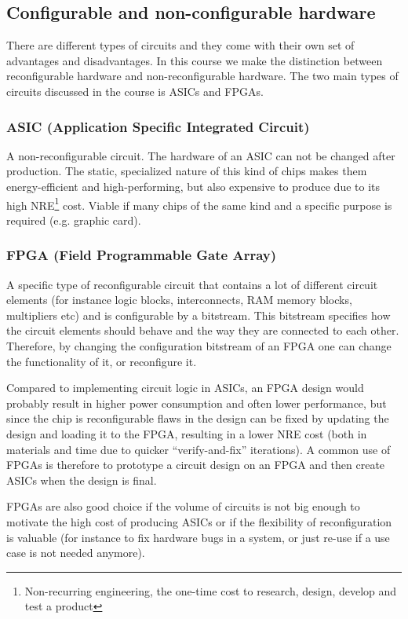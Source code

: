 \documentclass{article}
\begin{document}
\subsection{Configurable and non-configurable hardware}
There are different types of circuits and they come with their own set
of advantages and disadvantages. In this course we make the
distinction between reconfigurable hardware and non-reconfigurable
hardware. The two main types of circuits discussed in the course is
ASICs and FPGAs.

\subsubsection{ASIC (Application Specific Integrated Circuit)}
A non-reconfigurable circuit. The hardware of an ASIC can not be
changed after production. The static, specialized nature of this kind
of chips makes them energy-efficient and high-performing, but also
expensive to produce due to its high NRE\footnote{Non-recurring
  engineering, the one-time cost to research, design, develop and test
  a product} cost. Viable if many chips of the same kind and a
specific purpose is required (e.g. graphic card).

\subsubsection{FPGA (Field Programmable Gate Array)}
A specific type of reconfigurable circuit that contains a lot of
different circuit elements (for instance logic blocks, interconnects,
RAM memory blocks, multipliers etc) and is configurable by a
bitstream. This bitstream specifies how the circuit elements should
behave and the way they are connected to each other. Therefore, by
changing the configuration bitstream of an FPGA one can change the
functionality of it, or reconfigure it.

Compared to implementing circuit logic in ASICs, an FPGA design would
probably result in higher power consumption and often lower
performance, but since the chip is reconfigurable flaws in the design
can be fixed by updating the design and loading it to the FPGA,
resulting in a lower NRE cost (both in materials and time due to
quicker ``verify-and-fix'' iterations). A common use of FPGAs is
therefore to prototype a circuit design on an FPGA and then create
ASICs when the design is final.

FPGAs are also good choice if the volume of circuits is not big enough
to motivate the high cost of producing ASICs or if the flexibility of
reconfiguration is valuable (for instance to fix hardware bugs in a
system, or just re-use if a use case is not needed anymore).
\end{document}
